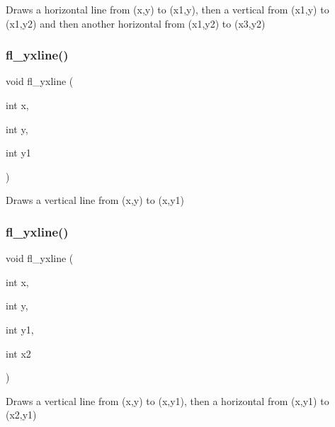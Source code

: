 Draws a horizontal line from (x,y) to (x1,y), then a vertical from (x1,y) to (x1,y2) and then another horizontal from (x1,y2) to (x3,y2) \mbox{\label{group__fl__drawings_ga814eabe0e8adf0a5017299cc2ecc26a1}} 
\subsubsection{\texorpdfstring{fl\+\_\+yxline()}{fl\_yxline()}\hspace{0.1cm}{\footnotesize\ttfamily [1/3]}}
{\footnotesize\ttfamily void fl\+\_\+yxline (\begin{DoxyParamCaption}\item[{int}]{x,  }\item[{int}]{y,  }\item[{int}]{y1 }\end{DoxyParamCaption})\hspace{0.3cm}{\ttfamily [inline]}}

Draws a vertical line from (x,y) to (x,y1) \mbox{\label{group__fl__drawings_ga9f5600eac117f72dd3fcb758729dab50}} 
\subsubsection{\texorpdfstring{fl\+\_\+yxline()}{fl\_yxline()}\hspace{0.1cm}{\footnotesize\ttfamily [2/3]}}
{\footnotesize\ttfamily void fl\+\_\+yxline (\begin{DoxyParamCaption}\item[{int}]{x,  }\item[{int}]{y,  }\item[{int}]{y1,  }\item[{int}]{x2 }\end{DoxyParamCaption})\hspace{0.3cm}{\ttfamily [inline]}}

Draws a vertical line from (x,y) to (x,y1), then a horizontal from (x,y1) to (x2,y1) \mbox{\label{group__fl__drawings_gae2e8c7095fbda86ce7812d7e74f1b153}} 
